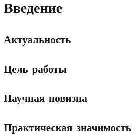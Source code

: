 \documentclass[14pt]{extreport}
\begin{document}
\pagebreak

\tableofcontents











\chapter*{Введение}

\section*{Актуальность}
\Actuality

\section*{Цель работы}
\Objective

\section*{Научная новизна}
\Novelty

\section*{Практическая значимость}
\PracticalValue

\end{document}
